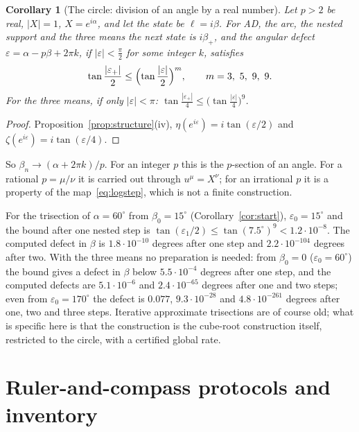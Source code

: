 \documentclass[10pt,a4paper]{article}
\theoremstyle{plain}
\newtheorem{corollary}[theorem]{Corollary}
\theoremstyle{remark}
\numberwithin{equation}{section}
\begin{document}
\begin{corollary}[The circle: division of an angle by a real number]\label{cor:angle}
Let $p>2$ be real, $|X|=1$, $X=e^{i\alpha}$, and let the state be $\ell=i\beta$. For AD, the arc,
the nested support and the three means the next state is $i\beta_+$, and the angular defect
$\varepsilon=\alpha-p\beta+2\pi k$, if $|\varepsilon|<\frac\pi2$ for some integer $k$, satisfies
\[
 \tan\frac{|\varepsilon_+|}{2}\le\Bigl(\tan\frac{|\varepsilon|}{2}\Bigr)^{m},\qquad m=3,\ 5,\ 9,\ 9 .
\]
For the three means, if only $|\varepsilon|<\pi$:
$\tan\frac{|\varepsilon_+|}{4}\le\bigl(\tan\frac{|\varepsilon|}{4}\bigr)^{9}$.
\end{corollary}

\begin{proof}
Proposition~\ref{prop:structure}(iv), $\eta(e^{i\varepsilon})=i\tan(\varepsilon/2)$ and
$\zeta(e^{i\varepsilon})=i\tan(\varepsilon/4)$.
\end{proof}

So $\beta_n\to(\alpha+2\pi k)/p$. For an integer $p$ this is the $p$-section of an angle. For a
rational $p=\mu/\nu$ it is carried out through $u^{\mu}=X^{\nu}$; for an irrational $p$ it is a
property of the map~\eqref{eq:logstep}, which is not a finite construction.

For the trisection of $\alpha=60^{\circ}$ from $\beta_0=15^{\circ}$ (Corollary~\ref{cor:start}),
$\varepsilon_0=15^{\circ}$ and the bound after one nested step is
$\tan(\varepsilon_1/2)\le\tan(7.5^{\circ})^{9}<1.2\cdot10^{-8}$. The computed defect in $\beta$ is
$1.8\cdot10^{-10}$ degrees after one step and $2.2\cdot10^{-104}$ degrees after two. With the three
means no preparation is needed: from $\beta_0=0$ ($\varepsilon_0=60^{\circ}$) the bound gives a
defect in $\beta$ below $5.5\cdot10^{-4}$ degrees after one step, and the computed defects are
$5.1\cdot10^{-6}$ and $2.4\cdot10^{-65}$ degrees after one and two steps; even from
$\varepsilon_0=170^{\circ}$ the defect is $0.077$, $9.3\cdot10^{-28}$ and $4.8\cdot10^{-261}$
degrees after one, two and three steps. Iterative
approximate trisections are of course old; what is specific here is that the construction is the
cube-root construction itself, restricted to the circle, with a certified global rate.

\section{Ruler-and-compass protocols and inventory}\label{sec:constructions}
\end{document}
